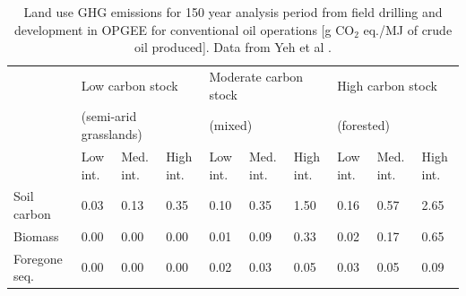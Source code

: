 \documentclass[11pt]{report}
\begin{document}
\begin{table}
\begin{scriptsize}
\caption{Land use GHG emissions for 150 year analysis period from field drilling and development in OPGEE for conventional oil operations [g CO$_2$ eq./MJ of crude oil produced]. Data from Yeh et al \cite{Yeh2010}.}
\label{tab:default_land_use_emissions}
\begin{tabular}{p{}p{}p{}p{}p{}p{}p{}p{}p{}p{}}
\toprule
& \multicolumn{3}{p{0.25\columnwidth}}{Low carbon stock } & \multicolumn{3}{p{0.25\columnwidth}}{Moderate carbon stock } & \multicolumn{3}{p{0.25\columnwidth}}{High carbon stock}\\
& \multicolumn{3}{p{0.25\columnwidth}}{(semi-arid grasslands)} & \multicolumn{3}{p{0.25\columnwidth}}{(mixed)} & \multicolumn{3}{p{0.25\columnwidth}}{(forested)}\\
\cmidrule{2-4} \cmidrule{5-7} \cmidrule{8-10}
& Low int. & Med. int. & High int. & Low int. & Med. int. & High int. & Low int. & Med. int. & High int.\\
\midrule
Soil carbon & 0.03 & 0.13 & 0.35 & 0.10 & 0.35 & 1.50 & 0.16 & 0.57 & 2.65\\
Biomass & 0.00 & 0.00 & 0.00 & 0.01 & 0.09 & 0.33 & 0.02 & 0.17 & 0.65\\
Foregone seq.\ & 0.00 & 0.00 & 0.00 & 0.02 & 0.03 & 0.05 & 0.03 & 0.05 & 0.09\\
\bottomrule
\end{tabular}
\end{scriptsize}
\end{table}
\end{document}
